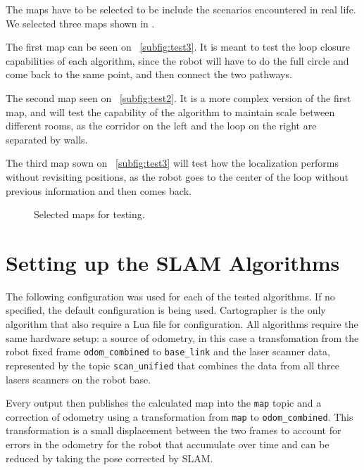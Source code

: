The maps have to be selected to be include the scenarios encountered in real life. We selected three maps shown in .

The first map can be seen on \figurename~\ref{subfig:test3}. It is meant to test the loop closure capabilities of each algorithm, since the robot will have to do the full circle and come back to the same point, and then connect the two pathways.

The second map seen on \figurename~\ref{subfig:test2}. It is a more complex version of the first map, and will test the capability of the algorithm to maintain scale between different rooms, as the corridor on the left and the loop on the right are separated by walls.

The third map sown on \figurename~\ref{subfig:test3} will test how the localization performs without revisiting positions, as the robot goes to the center of the loop without previous information and then comes back.

\begin{figure}[!ht]
     \centering
     \caption{Selected maps for testing.}
     \label{fig:generated_maps}
\end{figure}

\section{Setting up the SLAM Algorithms}\label{sec:slam}

The following configuration was used for each of the tested algorithms. If no specified, the default configuration is being used. Cartographer is the only algorithm that also require a Lua file for configuration. All algorithms require the same hardware setup: a source of odometry, in this case a transfomation from the robot fixed frame \texttt{odom\_combined} to \texttt{base\_link} and the laser scanner data, represented by the topic \texttt{scan\_unified} that combines the data from all three lasers scanners on the robot base.

Every output then publishes the calculated map into the \texttt{map} topic and a correction of odometry using a transformation from \texttt{map} to \texttt{odom\_combined}. This transformation is a small displacement between the two frames to account for errors in the odometry for the robot that accumulate over time and can be reduced by taking the pose corrected by SLAM.

